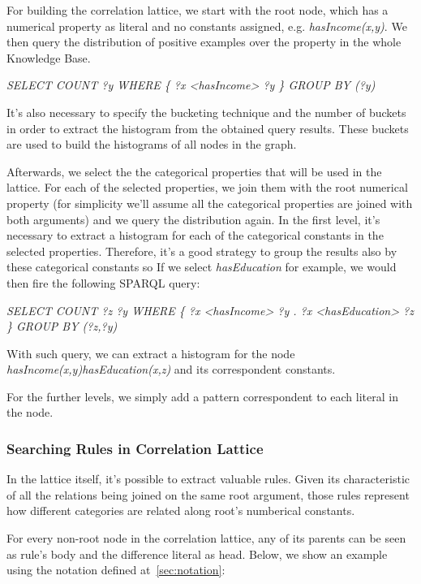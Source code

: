 For building the correlation lattice, we start with the root node, which has a numerical property as literal and no
constants assigned, e.g. \emph{hasIncome(x,y)}. We then query the  distribution of positive examples over the property
in the whole Knowledge Base.

\begin{center}
 \emph{SELECT COUNT ?y WHERE \{ ?x <hasIncome> ?y \} GROUP BY (?y)}
\end{center}

It's also necessary to specify the bucketing technique and the number of buckets in order to extract the histogram from the obtained query results. These buckets are used to build the histograms of all nodes in the graph.

Afterwards, we select the the categorical properties that will be used in the lattice. For each of the selected properties, we join them with the root numerical property (for simplicity we'll assume all the categorical properties are joined with both  arguments) and we query the distribution again. In the first level, it's necessary to extract a histogram for each of the categorical constants in the selected properties. Therefore, it's a good strategy to group the results also by these categorical constants so If we select \emph{hasEducation} for example, we would then fire the following SPARQL query:

\begin{center}
 \emph{SELECT COUNT ?z ?y WHERE \{ ?x <hasIncome> ?y . ?x <hasEducation> ?z \} GROUP BY (?z,?y)}
\end{center}

With such query, we can extract a histogram for the node \emph{hasIncome(x,y)hasEducation(x,z)} and its correspondent
constants. 

For the further levels, we simply add a pattern correspondent to each literal in the node. 


\subsubsection{Searching Rules in Correlation Lattice}

In the lattice itself, it's possible to extract valuable rules. Given its characteristic of all the relations being
joined on the same root argument, those rules represent how different categories are related along root's numberical
constants.

For every non-root node in the correlation lattice, any of its parents can be seen as rule's body and the difference
literal as head. Below, we show an example using the notation defined at~\ref{sec:notation}:

